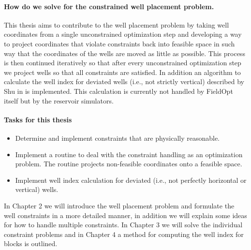 \paragraph{How do we solve for the constrained well placement
problem.}
%
This thesis aims to contribute to the well placement problem
by taking well coordinates from a single unconstrained optimization
step and developing a way to project coordinates that violate
constraints back into feasible space in such way that the 
coordinates of the wells are moved as little as possible.
This process is then continued iteratively so that after every
unconstrained optimization step we project wells so that all
constraints are satisfied. In addition an algorithm to calculate
the well index for deviated wells (i.e., not strictly vertical)
described by Shu in \cite{Shu_Paper} is implemented. This
calculation is currently not handled by FieldOpt itself but by 
the reservoir simulators.
%
\paragraph{Tasks for this thesis}
%
\begin{itemize}
 	\item {Determine and implement constraints 
 	that are physically reasonable.}
 	\item {Implement a routine to deal with the 
 	constraint handling as an optimization problem. 
 	The routine projects non-feasible coordinates 
 	onto a feasible space.}
 	\item {Implement well index calculation for 
 	deviated (i.e., not perfectly horizontal or 
 	vertical) wells.}
 \end{itemize} 
%
% 
In Chapter 2 we will introduce the well placement problem and formulate the
well constraints in a more detailed manner, in addition we will explain
some ideas for how to handle multiple constraints. In Chapter 3 we will solve
the individual constraint problems and in Chapter 4 a method for computing 
the well index for blocks is outlined.
%




